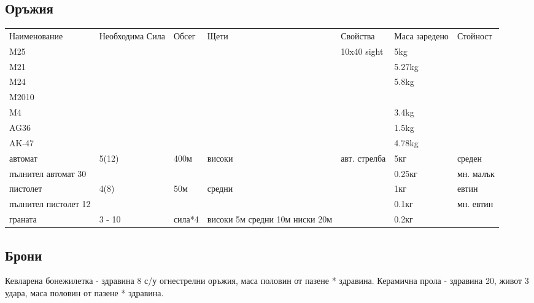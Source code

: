 \subsection{Оръжия}
\begin{tabular}{p{2cm} | p{2cm} | p{2cm} | p{2cm} | p{2cm} | p{2cm} | p{2cm}}
Наименование          & Необходима Сила      & Обсег      & Щети       & Свойства       & Маса заредено & Стойност         \\
M25                   &                      &            &            & 10x40 sight    & 5kg           &                  \\  %
M21                   &                      &            &            &                & 5.27kg        &                  \\  %
M24                   &                      &            &            &                & 5.8kg         &                  \\  %
M2010                 &                      &            &            &                &               &                  \\
M4                    &                      &            &            &                & 3.4kg         &                  \\  %
AG36                  &                      &            &            &                & 1.5kg         &                  \\  %
AK-47                 &                      &            &            &                & 4.78kg        &                  \\  %
%
автомат               & 5(12)                & 400м       & високи     & авт. стрелба   & 5кг           & среден           \\
пълнител автомат 30   &                      &            &            &                & 0.25кг        & мн. малък        \\
пистолет              & 4(8)                 & 50м        & средни     &                & 1кг           & евтин            \\
пълнител пистолет 12  &                      &            &            &                & 0.1кг         & мн. евтин        \\
граната               & 3 - 10               & сила*4     & високи 5м средни 10м ниски 20м & & 0.2кг    &                  \\

\end{tabular}

\subsection{Брони}
Кевларена бонежилетка - здравина 8 с/у огнестрелни оръжия, маса половин от пазене * здравина.
Керамична прола - здравина 20, живот 3 удара, маса половин от пазене * здравина.

